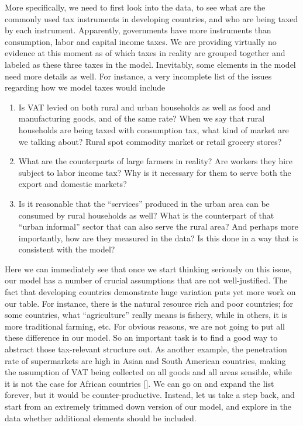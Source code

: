 \documentclass[twoside,11pt,leqno]{article}
\begin{document}
More specifically, we need to first look into the data, to see what are the commonly used tax instruments in developing countries, and who are being taxed by each instrument. Apparently, governments have more instruments than consumption, labor and capital income taxes. We are providing virtually no evidence at this moment as of which taxes in reality are grouped together and labeled as these three taxes in the model. Inevitably, some elements in the model need more details as well. For instance, a very incomplete list of the issues regarding how we model taxes would include
\begin{enumerate}
    \item
    Is VAT levied on both rural and urban households as well as food and manufacturing goods, and of the same rate? When we say that rural households are being taxed with consumption tax, what kind of market are we talking about? Rural spot commodity market or retail grocery stores?
    \item
    What are the counterparts of large farmers in reality? Are workers they hire subject to labor income tax? Why is it necessary for them to serve both the export and domestic markets?
    \item
    Is it reasonable that the ``services'' produced in the urban area can be consumed by rural households as well? What is the counterpart of that ``urban informal'' sector that can also serve the rural area? And perhaps more importantly, how are they measured in the data? Is this done in a way that is consistent with the model?
\end{enumerate}
Here we can immediately see that once we start thinking seriously on this issue, our model has a number of crucial assumptions that are not well-justified. The fact that developing countries demonstrate huge variation puts yet more work on our table. For instance, there is the natural resource rich and poor countries; for some countries, what ``agriculture'' really means is fishery, while in others, it is more traditional farming, etc. For obvious reasons, we are not going to put all these difference in our model. So an important task is to find a good way to abstract those tax-relevant structure out. As another example, the penetration rate of supermarkets are high in Asian and South American countries, making the assumption of VAT being collected on all goods and all areas sensible, while it is not the case for African countries [\citet{ReardonTimmer:2007}]. We can go on and expand the list forever, but it would be counter-productive. Instead, let us take a step back, and start from an extremely trimmed down version of our model, and explore in the data whether additional elements should be included.
\end{document}
